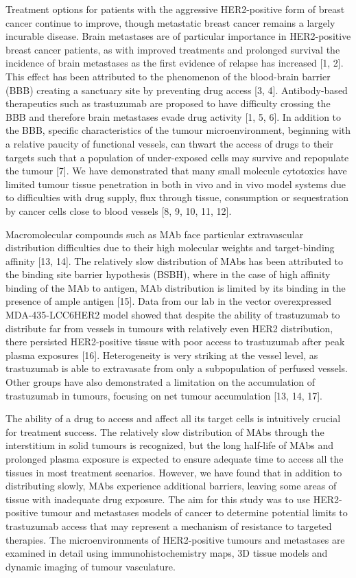 Treatment options for patients with the aggressive HER2-positive form of breast cancer continue to improve, though metastatic breast cancer remains a largely incurable disease.
Brain metastases are of particular importance in HER2-positive breast cancer patients, as with improved treatments and prolonged survival the incidence of brain metastases as the first evidence of relapse has increased [1, 2].
This effect has been attributed to the phenomenon of the blood-brain barrier (BBB) creating a sanctuary site by preventing drug access [3, 4].
Antibody-based therapeutics such as trastuzumab are proposed to have difficulty crossing the BBB and therefore brain metastases evade drug activity [1, 5, 6].
In addition to the BBB, specific characteristics of the tumour microenvironment, beginning with a relative paucity of functional vessels, can thwart the access of drugs to their targets such that a population of under-exposed cells may survive and repopulate the tumour [7].
We have demonstrated that many small molecule cytotoxics have limited tumour tissue penetration in both in vivo and in vivo model systems due to difficulties with drug supply, flux through tissue, consumption or sequestration by cancer cells close to blood vessels [8, 9, 10, 11, 12].

Macromolecular compounds such as \ac{MAb} face particular extravascular distribution difficulties due to their high molecular weights and target-binding affinity [13, 14].
The relatively slow distribution of \ac{MAbs} has been attributed to the binding site barrier hypothesis (BSBH), where in the case of high affinity binding of the \ac{MAb} to antigen, \ac{MAb} distribution is limited by its binding in the presence of ample antigen [15].
Data from our lab in the vector overexpressed MDA-435-LCC6HER2 model showed that despite the ability of trastuzumab to distribute far from vessels in tumours with relatively even HER2 distribution, there persisted HER2-positive tissue with poor access to trastuzumab after peak plasma exposures [16].
Heterogeneity is very striking at the vessel level, as trastuzumab is able to extravasate from only a subpopulation of perfused vessels.
Other groups have also demonstrated a limitation on the accumulation of trastuzumab in tumours, focusing on net tumour accumulation [13, 14, 17].

The ability of a drug to access and affect all its target cells is intuitively crucial for treatment success.
The relatively slow distribution of \ac{MAbs} through the interstitium in solid tumours is recognized, but the long half-life of \ac{MAbs} and prolonged plasma exposure is expected to ensure adequate time to access all the tissues in most treatment scenarios.
However, we have found that in addition to distributing slowly, \ac{MAbs} experience additional barriers, leaving some areas of tissue with inadequate drug exposure.
The aim for this study was to use HER2-positive tumour and metastases models of cancer to determine potential limits to trastuzumab access that may represent a mechanism of resistance to targeted therapies.
The microenvironments of HER2-positive tumours and metastases are examined in detail using immunohistochemistry maps, 3D tissue models and dynamic imaging of tumour vasculature.

